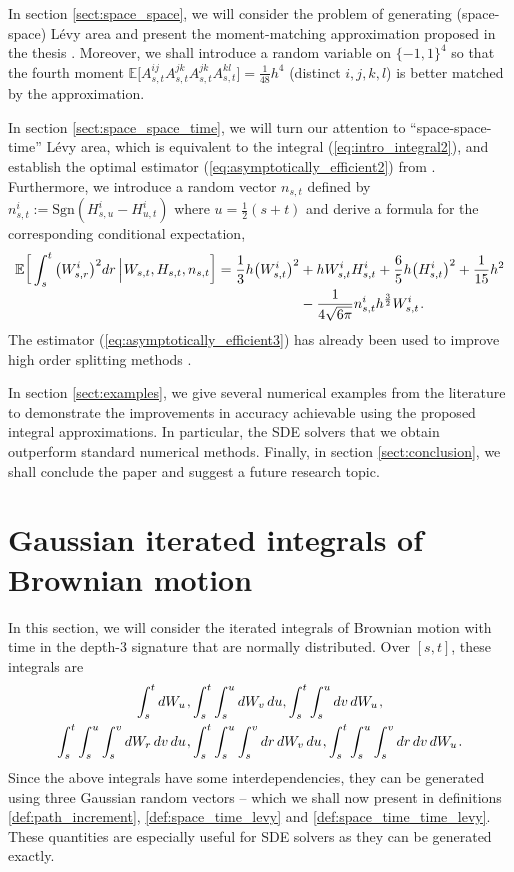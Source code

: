 \documentclass[sn-mathphys-num]{sn-jnl}%
\newcommand{\E}{\mathbb{E}}
\newcommand{\m}{\hspace{0.25mm}}
\begin{document}
In section \ref{sect:space_space}, we will consider the problem of generating (space-space) L\'{e}vy area and present the moment-matching approximation proposed in the thesis \cite[Section 7.3]{foster2020thesis}.
Moreover, we shall introduce a random variable on $\{-1,1\}^4$ so that the fourth moment $\E\big[A_{s,t}^{ij}A_{s,t}^{jk}A_{s,t}^{jk}A_{s,t}^{kl}\big] = \frac{1}{48}h^4$  (distinct $i,j,k,l$) is better matched by the approximation.\medbreak

In section \ref{sect:space_space_time}, we will turn our attention to ``space-space-time'' L\'{e}vy area, which is equivalent to the integral (\ref{eq:intro_integral2}), and establish the optimal estimator (\ref{eq:asymptotically_efficient2}) from \cite{foster2020thesis, foster2020poly}. Furthermore, we introduce a random vector $n_{s,t}$ defined by $n_{s,t}^i := \mathrm{Sgn}(H_{s,u}^i - H_{u,t}^i)$ where $u=\frac{1}{2}(s+t)$ and derive a formula for the corresponding conditional expectation,
\begin{align}\label{eq:asymptotically_efficient3}
\E\bigg[ \int_s^t \big(W_{s,r}^i\big)^2 dr\,\Big|\m W_{s,t}, H_{s,t}, n_{s,t}\bigg] = \frac{1}{3}h\big(W_{s,t}^i\big)^2 & + hW_{s,t}^i H_{s,t}^i + \frac{6}{5}h\big(H_{s,t}^i\big)^2 + \frac{1}{15}h^2\nonumber\\[-2pt]
& - \frac{1}{4\sqrt{6\pi}}n_{s,t}^i h^\frac{3}{2} W_{s,t}^i\m.
\end{align}
The estimator (\ref{eq:asymptotically_efficient3}) has already been used to improve high order splitting methods \cite{foster2024splitting}.\medbreak

In section \ref{sect:examples}, we give several numerical examples from the literature to demonstrate the improvements in accuracy achievable using the proposed integral approximations. In particular, the SDE solvers that we obtain outperform standard numerical methods.
Finally, in section \ref{sect:conclusion}, we shall conclude the paper and suggest a future research topic.

\section{Gaussian iterated integrals of Brownian motion}\label{sect:gaussian_integrals}

In this section, we will consider the iterated integrals of Brownian motion with time in the depth-3 signature that are normally distributed. Over $[s,t]$, these integrals are
\begin{align*}
\int_s^t dW_u\m, &\int_s^t\int_s^u dW_v\, du, \int_s^t\int_s^u dv\, dW_u\m,\\ \int_s^t\int_s^u\int_s^v dW_r\, dv\, du\m, &\int_s^t\int_s^u\int_s^v dr\, dW_v\, du\m, \int_s^t\int_s^u\int_s^v dr\, dv\, dW_u\m.
\end{align*}
Since the above integrals have some interdependencies, they can be generated using three Gaussian random vectors -- which we shall now present in definitions \ref{def:path_increment}, \ref{def:space_time_levy} and \ref{def:space_time_time_levy}.
These quantities are especially useful for SDE solvers as they can be generated exactly.
\medbreak
\end{document}
